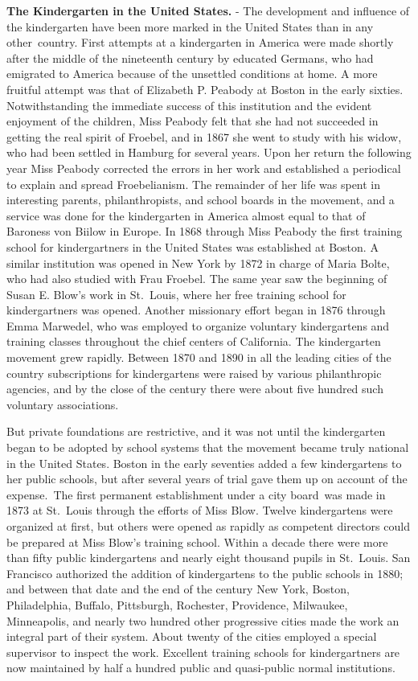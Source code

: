 \documentclass[]{book}
\begin{document}
\textbf{The Kindergarten in the United States.} - The development and influence of the kindergarten have been more marked in the United States than in any other~country. First attempts at a kindergarten in America were made shortly after the middle of the nineteenth century by educated Germans, who had emigrated to America because of the unsettled conditions at home. A more fruitful attempt was that of Elizabeth P. Peabody at Boston in the early sixties. Notwithstanding the immediate success of this institution and the evident enjoyment of the children, Miss Peabody felt that she had not succeeded in getting the real spirit of Froebel, and in 1867 she went to study with his widow, who had been settled in Hamburg for several years. Upon her return the following year Miss Peabody corrected the errors in her work and established a periodical to explain and spread Froebelianism. The remainder of her life was spent in interesting parents, philanthropists, and school boards in the movement, and a service was done for the kindergarten in America almost equal to that of Baroness von Biilow in Europe. In 1868 through Miss Peabody the first training school for kindergartners in the United States was established at Boston. A similar institution was opened in New York by 1872 in charge of Maria Bolte, who had also studied with Frau Froebel. The same year saw the beginning of Susan E. Blow's work in St.~Louis, where her free training school for kindergartners was opened. Another missionary effort began in 1876 through Emma Marwedel, who was employed to organize voluntary kindergartens and training classes throughout the chief centers of California. The kindergarten movement grew rapidly. Between 1870 and 1890 in all the leading cities of the country subscriptions for kindergartens were raised by various philanthropic agencies, and by the close of the century there were about five hundred such voluntary associations.

But private foundations are restrictive, and it was not until the kindergarten began to be adopted by school systems that the movement became truly national in the United States. Boston in the early seventies added a few kindergartens to her public schools, but after several years of trial gave them up on account of the expense.~The first permanent establishment under a city board~was made in 1873 at St.~Louis through the efforts of Miss Blow. Twelve kindergartens were organized at first, but others were opened as rapidly as competent directors could be prepared at Miss Blow's training school. Within a decade there were more than fifty public kindergartens and nearly eight thousand pupils in St.~Louis. San Francisco authorized the addition of kindergartens to the public schools in 1880; and between that date and the end of the century New York, Boston, Philadelphia, Buffalo, Pittsburgh, Rochester, Providence, Milwaukee, Minneapolis, and nearly two hundred other progressive cities made the work an integral part of their system. About twenty of the cities employed a special supervisor to inspect the work. Excellent training schools for kindergartners are now maintained by half a hundred public and quasi-public normal institutions.
\end{document}
